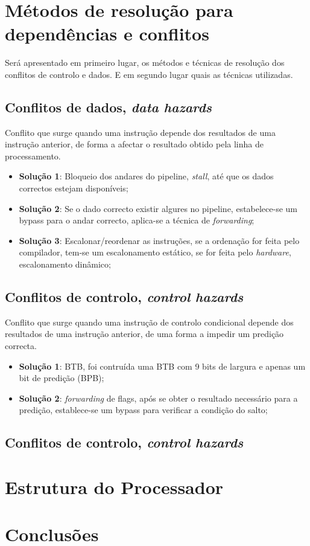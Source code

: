 \documentclass[11pt]{article}
\numberwithin{equation}{section}
\begin{document}
\section{Métodos de resolução para dependências e conflitos}


Será apresentado em primeiro lugar, os métodos e técnicas de resolução dos conflitos de controlo e dados. E em segundo lugar quais as técnicas utilizadas.


\subsection{Conflitos de dados, \textit{data hazards}}
Conflito que surge quando uma instrução depende dos	resultados de uma instrução anterior, de forma a afectar o resultado obtido pela linha de processamento.

\begin{itemize}
	\item \textbf{Solução 1}: Bloqueio dos andares do pipeline, \textit{stall}, até que os dados correctos estejam disponíveis;
	\item \textbf{Solução 2}: Se o dado correcto existir algures no pipeline, estabelece-se um bypass para o andar correcto, aplica-se a técnica de \textit{forwarding};
	\vspace{-2.5mm}
	\item \textbf{Solução 3}: Escalonar/reordenar as instruções, se a ordenação for feita pelo compilador, tem-se um escalonamento estático, se for feita pelo \textit{hardware}, escalonamento dinâmico;
\end{itemize}

\subsection{Conflitos de controlo, \textit{control hazards}}
Conflito que surge quando uma instrução de controlo condicional depende dos	resultados de uma instrução anterior, de uma forma a impedir um predição correcta.

\begin{itemize}
	\item \textbf{Solução 1}: BTB, foi contruída uma BTB com 9 bits de largura e apenas um bit de predição (BPB);
	\item \textbf{Solução 2}: \textit{forwarding} de flags, após se obter o resultado necessário para a predição, establece-se um bypass para verificar a condição do salto;
	\vspace{-2.5mm}
\end{itemize}

\subsection{Conflitos de controlo, \textit{control hazards}}

\section{Estrutura do Processador}

\section{Conclusões}

\pagebreak

\listoftodos
\end{document}
